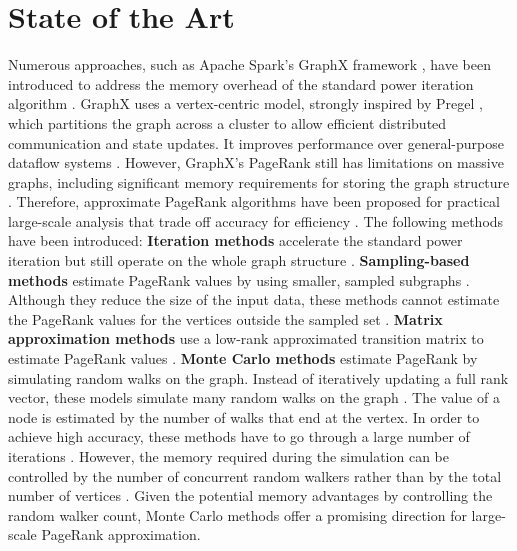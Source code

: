 \documentclass[a4paper,12pt]{article}
\begin{document}
\section{State of the Art}
Numerous approaches, such as Apache Spark's GraphX framework \cite{xin_graphx_2013}, have been introduced to address the memory overhead of the standard power iteration algorithm \cite{page_pagerank_1999}.
GraphX uses a vertex-centric model, strongly inspired by Pregel \cite{malewicz_pregel_2010}, which partitions the graph across a cluster to allow efficient distributed communication and state updates. It improves performance over general-purpose dataflow systems \cite{jin_software_2022}. However, GraphX's PageRank still has limitations on massive graphs, including significant memory requirements for storing the graph structure \cite{wu_efficient_2024}\cite{xin_graphx_2014}. Therefore, approximate PageRank algorithms have been proposed for practical large-scale analysis that trade off accuracy for efficiency \cite{wu_efficient_2024}. The following methods have been introduced:
\textbf{Iteration methods} \cite{xie_parameterized_2023-1}\cite{anikin_efficient_2022} accelerate the standard power iteration but still operate on the whole graph structure \cite{wu_efficient_2024}. 
\textbf{Sampling-based methods} estimate PageRank values by using smaller, sampled subgraphs \cite{bar-yossef_local_2008}\cite{chen_local_2004}. Although they reduce the size of the input data, these methods cannot estimate the PageRank values for the vertices outside the sampled set \cite{wu_efficient_2024}.
\textbf{Matrix approximation methods} use a low-rank approximated transition matrix to estimate PageRank values \cite{liu_fast_2015}\cite{benczur_feasibility_2005}. 
\textbf{Monte Carlo methods} estimate PageRank by simulating random walks on the graph. Instead of iteratively updating a full rank vector, these models simulate many random walks on the graph \cite{avrachenkov_monte_2007}. The value of a node is estimated by the number of walks that end at the vertex. In order to achieve high accuracy, these methods have to go through a large number of iterations \cite{wu_efficient_2024}. However, the memory required during the simulation can be controlled by the number of concurrent random walkers rather than by the total number of vertices \cite{avrachenkov_monte_2007}. Given the potential memory advantages by controlling the random walker count, Monte Carlo methods offer a promising direction for large-scale PageRank approximation.
 
\end{document}
